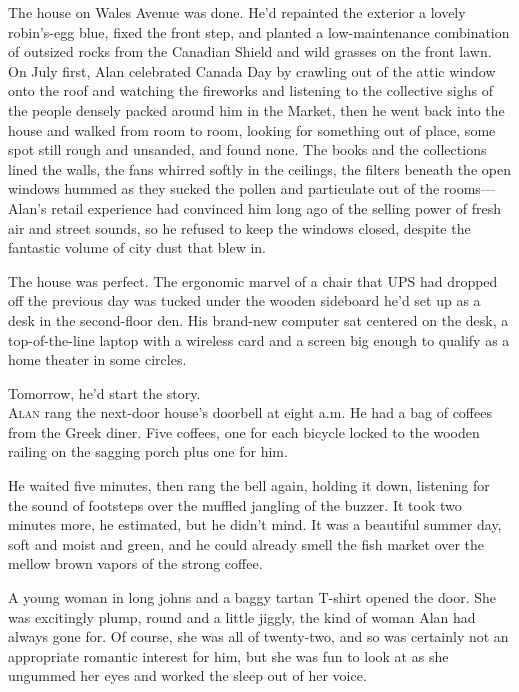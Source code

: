 \documentclass{article}
\begin{document}
The house on Wales Avenue was done.  He'd repainted the exterior a
lovely robin's-egg blue, fixed the front step, and planted a
low-maintenance combination of outsized rocks from the Canadian Shield
and wild grasses on the front lawn.  On July first, Alan celebrated
Canada Day by crawling out of the attic window onto the roof and
watching the fireworks and listening to the collective sighs of the
people densely packed around him in the Market, then he went back into
the house and walked from room to room, looking for something out of
place, some spot still rough and unsanded, and found none.  The books
and the collections lined the walls, the fans whirred softly in the
ceilings, the filters beneath the open windows hummed as they sucked
the pollen and particulate out of the rooms---Alan's retail experience
had convinced him long ago of the selling power of fresh air and
street sounds, so he refused to keep the windows closed, despite the
fantastic volume of city dust that blew in.

The house was perfect.  The ergonomic marvel of a chair that UPS had
dropped off the previous day was tucked under the wooden sideboard
he'd set up as a desk in the second-floor den.  His brand-new computer
sat centered on the desk, a top-of-the-line laptop with a wireless
card and a screen big enough to qualify as a home theater in some
circles.

Tomorrow, he'd start the story.
\\
\lettrine[lines=3, lhang=.5, nindent=0pt, findent=2pt]{A}{lan} rang the next-door house's doorbell at eight a.m.  He had a bag
of coffees from the Greek diner.  Five coffees, one for each bicycle
locked to the wooden railing on the sagging porch plus one for him.

He waited five minutes, then rang the bell again, holding it down,
listening for the sound of footsteps over the muffled jangling of the
buzzer.  It took two minutes more, he estimated, but he didn't mind. 
It was a beautiful summer day, soft and moist and green, and he could
already smell the fish market over the mellow brown vapors of the
strong coffee.

A young woman in long johns and a baggy tartan T-shirt opened the
door.  She was excitingly plump, round and a little jiggly, the kind
of woman Alan had always gone for.  Of course, she was all of
twenty-two, and so was certainly not an appropriate romantic interest
for him, but she was fun to look at as she ungummed her eyes and
worked the sleep out of her voice.
\end{document}
